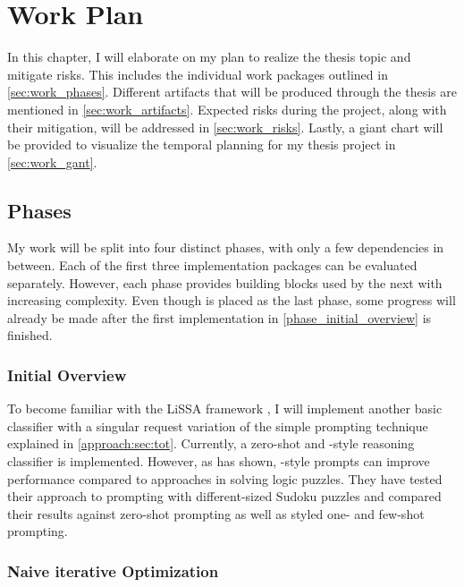 \chapter{Work Plan}
\label{chap:work_plan}

In this chapter, I will elaborate on my plan to realize the thesis topic and mitigate risks. This includes the individual work packages outlined in \autoref{sec:work_phases}. Different artifacts that will be produced through the thesis are mentioned in \autoref{sec:work_artifacts}. Expected risks during the project, along with their mitigation, will be addressed in \autoref{sec:work_risks}. Lastly, a giant chart will be provided to visualize the temporal planning for my thesis project in \autoref{sec:work_gant}.

\section{Phases}
\label{sec:work_phases}

My work will be split into four distinct phases, with only a few dependencies in between. Each of the first three implementation packages can be evaluated separately. However, each phase provides building blocks used by the next with increasing complexity. Even though  is placed as the last phase, some progress will already be made after the first implementation in \autoref{phase_initial_overview} is finished.


\subsection{Initial Overview}
\label{phase_initial_overview}

To become familiar with the LiSSA framework \cite{fuchss2025LiSSAGeneric}, I will implement another basic classifier with a singular request variation of the simple prompting technique \ToT  \cite{long2023LargeLanguage} explained in \autoref{approach:sec:tot}. 
Currently, a zero-shot and \CoT-style reasoning classifier is implemented. However, as \citeauthor{long2023LargeLanguage} has shown, \ToT-style prompts can improve performance compared to \CoT approaches in solving logic puzzles. They have tested their approach to \ToT prompting with different-sized Sudoku puzzles and compared their results against zero-shot prompting as well as \CoT styled one- and few-shot prompting. 


\subsection{Naive iterative Optimization}
\label{phase_naive_iterative}

